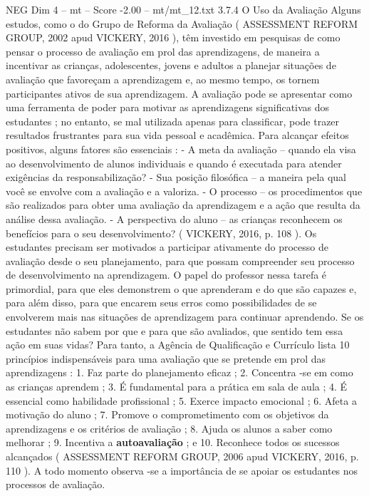 \begin{textsample}{NEG Dim 4 – mt – Score -2.00 – mt/mt\_12.txt}  \label{ex:f4_neg_119}
3.7.4 O Uso da Avaliação Alguns estudos, como o do Grupo de Reforma da Avaliação ( ASSESSMENT REFORM GROUP, 2002 apud VICKERY, 2016 ), têm investido em pesquisas de como pensar o processo de avaliação em prol das aprendizagens, de maneira a incentivar as crianças, adolescentes, jovens e adultos a planejar situações de avaliação que favoreçam a aprendizagem e, ao mesmo tempo, os tornem participantes ativos de sua aprendizagem.
A avaliação pode se apresentar como uma ferramenta de poder para motivar as aprendizagens significativas dos estudantes ; no entanto, se mal utilizada apenas para classificar, pode trazer resultados frustrantes para sua vida pessoal e acadêmica.
Para alcançar efeitos positivos, alguns fatores são essenciais : - A meta da avaliação – quando ela visa ao desenvolvimento de alunos individuais e quando é executada para atender exigências da responsabilização? - Sua posição filosófica – a maneira pela qual você se envolve com a avaliação e a valoriza. - O processo – os procedimentos que são realizados para obter uma avaliação da aprendizagem e a ação que resulta da análise dessa avaliação. - A perspectiva do aluno – as crianças reconhecem os benefícios para o seu desenvolvimento? ( VICKERY, 2016, p. 108 ).
Os estudantes precisam ser motivados a participar ativamente do processo de avaliação desde o seu planejamento, para que possam compreender seu processo de desenvolvimento na aprendizagem.
O papel do professor nessa tarefa é primordial, para que eles demonstrem o que aprenderam e do que são capazes e, para além disso, para que encarem seus erros como possibilidades de se envolverem mais nas situações de aprendizagem para continuar aprendendo.
Se os estudantes não sabem por que e para que são avaliados, que sentido tem essa ação em suas vidas?
Para tanto, a Agência de Qualificação e Currículo lista 10 princípios indispensáveis para uma avaliação que se pretende em prol das aprendizagens : 1.
Faz parte do planejamento eficaz ; 2.
Concentra -se em como as crianças aprendem ; 3.
É fundamental para a prática em sala de aula ; 4.
É essencial como habilidade profissional ; 5.
Exerce impacto emocional ; 6.
Afeta a motivação do aluno ; 7.
Promove o comprometimento com os objetivos da aprendizagens e os critérios de avaliação ; 8.
Ajuda os alunos a saber como melhorar ; 9.
Incentiva a \textbf{autoavaliação} ; e 10.
Reconhece todos os sucessos alcançados ( ASSESSMENT REFORM GROUP, 2006 apud VICKERY, 2016, p. 110 ).
A todo momento observa -se a importância de se apoiar os estudantes nos processos de avaliação.

\end{textsample}
